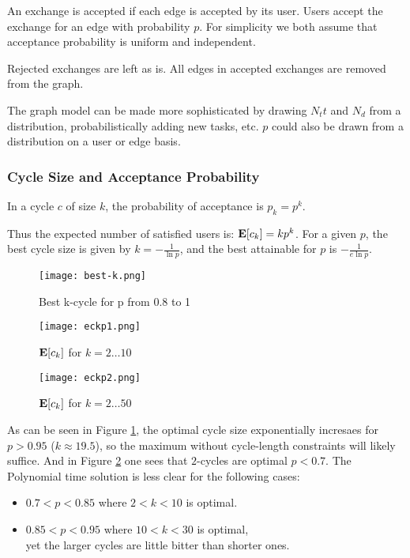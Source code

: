\documentclass[main.tex]{subfiles}
\begin{document}
An exchange is accepted if each edge is accepted by its user. Users accept the exchange for an edge with probability $p$. For simplicity we both assume that acceptance probability is uniform and independent.

Rejected exchanges are left as is. All edges in accepted exchanges are removed from the graph.

The graph model can be made more sophisticated by drawing $N_tt$ and $N_d$ from a distribution, probabilistically adding new tasks, etc. $p$ could also be drawn from a distribution on a user or edge basis.

\subsubsection{Cycle Size and Acceptance Probability}

In a cycle $c$ of size $k$, the probability of acceptance is $p_k = p^k$.

Thus the expected number of satisfied users is: $\mathbf{E}[c_k] = k p^k$. For a given $p$, the best cycle size is given by $k = -\frac{1}{\ln p}$, and the best attainable for $p$ is $-\frac{1}{e \ln p}$.

\begin{figure}
  \texttt{[image: best-k.png]}
  \caption{Best k-cycle for p from 0.8 to 1}
  \label{best-k}
\end{figure}

\begin{figure}
  \texttt{[image: eckp1.png]}
  \caption{$\mathbf{E}[c_k]$ for $k = 2 \dots 10$}
  \label{eckp1}
\end{figure}

\begin{figure}
  \texttt{[image: eckp2.png]}
  \caption{$\mathbf{E}[c_k]$ for $k = 2 \dots 50$}
  \label{eckp2}
\end{figure}

As can be seen in Figure \ref{best-k}, the optimal cycle size exponentially incresaes for $p > 0.95$ ($k \approx 19.5$), so the maximum without cycle-length constraints will likely suffice. And in Figure \ref{eckp1} one sees that $2$-cycles are optimal $p < 0.7$. The Polynomial time solution is less clear for the following cases:
\begin{itemize}
  \item $0.7 < p < 0.85$ where $ 2 < k < 10$ is optimal.
  \item $0.85 < p < 0.95$ where $ 10 < k < 30$ is optimal,
      \\yet the larger cycles are little bitter than shorter ones.
\end{itemize}
\end{document}
